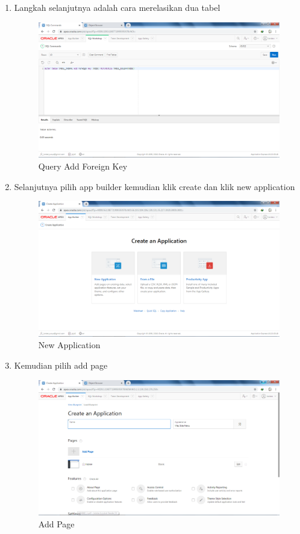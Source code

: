 \begin{enumerate}
\item Langkah selanjutnya adalah cara merelasikan dua tabel
\begin{figure}[H]
\centering
\caption{Query Add Foreign Key}
\includegraphics[width=1\textwidth]{figures/13.png}
\end{figure}

\item Selanjutnya pilih app builder kemudian klik create dan klik new application
\begin{figure}[H]
\centering
\caption{New Application}
\includegraphics[width=1\textwidth]{figures/2.png}
\end{figure}

\item Kemudian pilih add page
\begin{figure}[H]
\centering
\caption{Add Page}
\includegraphics[width=1\textwidth]{figures/14.png}
\end{figure}


\end{enumerate}
